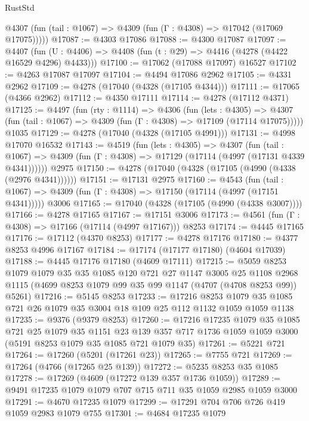 \begin{lexlean}{RustStd}
\begin{coremodule}
      @4307 (fun (tail : @1067) => @4309 (fun (Γ : @4308) => @17042 (@17069 @17075)))))
@17087 := @4303 @17086
@17088 := @4300 @17087
@17097 := @4407
    (fun (U : @4406) => @4408 (fun (t : @29) => @4416 (@4278 (@4422 @16529 @4296) @4433)))
@17100 := @17062 (@17088 @17097) @16527
@17102 := @4263 @17087 @17097
@17104 := @4494 @17086 @2962
@17105 := @4331 @2962
@17109 := @4278 (@17040 (@4328 (@17105 @4344)))
@17111 := @17065 (@4366 @2962)
@17112 := @4350 @17111
@17114 := @4278 (@17112 @4371)
@17125 := @4497
    (fun (rty : @1114) =>
    @4306
      (fun (lets : @4305) =>
      @4307 (fun (tail : @1067) => @4309 (fun (Γ : @4308) => @17109 (@17114 @17075)))))
    @1035
@17129 := @4278 (@17040 (@4328 (@17105 @4991)))
@17131 := @4998 @17070 @16532
@17143 := @4519
    (fun (lets : @4305) =>
    @4307
      (fun (tail : @1067) =>
      @4309 (fun (Γ : @4308) => @17129 (@17114 (@4997 (@17131 @4339 @4341))))))
    @2975
@17150 := @4278 (@17040 (@4328 (@17105 (@4990 (@4338 (@2976 @4341))))))
@17151 := @17131 @2975
@17160 := @4543
    (fun (tail : @1067) => @4309 (fun (Γ : @4308) => @17150 (@17114 (@4997 (@17151 @4341)))))
    @3006
@17165 := @17040 (@4328 (@17105 (@4990 (@4338 @3007))))
@17166 := @4278 @17165
@17167 := @17151 @3006
@17173 := @4561 (fun (Γ : @4308) => @17166 (@17114 (@4997 @17167))) @8253
@17174 := @4445 @17165
@17176 := @17112 (@4370 @8253)
@17177 := @4278 @17176
@17180 := @4377 @8253 @4996 @17167
@17184 := @17174 (@17177 @17180) (@4604 @17039)
@17188 := @4445 @17176 @17180 (@4609 @17111)
@17215 := @5059
    @8253
    @1079
    @1079
    @35
    @35
    @1085
    @120
    @721
    @27
    @1147
    @3005
    @25
    @1108
    @2968
    @1115
    (@4699 @8253 @1079 @99 @35 @99 @1147 (@4707 (@4708 @8253 @99)) @5261)
@17216 := @5145 @8253
@17233 := @17216
    @8253
    @1079
    @35
    @1085
    @721
    @26
    @1079
    @35
    @3004
    @18
    @109
    @25
    @112
    @1132
    @1059
    @1059
    @1138
@17235 := @9376 (@9379 @8253)
@17260 := @17216
    @17235
    @1079
    @35
    @1085
    @721
    @25
    @1079
    @35
    @1151
    @23
    @139
    @357
    @717
    @1736
    @1059
    @1059
    @3000
    (@5191 @8253 @1079 @35 @1085 @721 @1079 @35)
@17261 := @5221 @721
@17264 := @17260 (@5201 (@17261 @23))
@17265 := @7755 @721
@17269 := @17264 (@4766 (@17265 @25 @139))
@17272 := @5235 @8253 @35 @1085
@17278 := @17269 (@4609 (@17272 @139 @357 @1736 @1059))
@17289 := @9491 @17235 @1079 @1079 @707 @715 @711 @35 @1059 @2985 @1059 @3000
@17291 := @4670 @17235 @1079
@17299 := @17291 @704 @706 @726 @419 @1059 @2983 @1079 @755
@17301 := @4684 @17235 @1079

\end{coremodule}
\end{lexlean}
